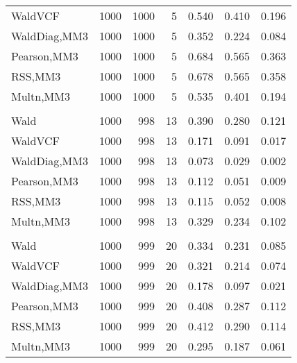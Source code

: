 \documentclass[
]{article}
\begin{document}
\begin{table}[H]
{\begin{tabular}[t]{lrrrrrr}
\hspace{1em}WaldVCF & 1000 & 1000 & 5 & 0.540 & 0.410 & 0.196\\
\hspace{1em}WaldDiag,MM3 & 1000 & 1000 & 5 & 0.352 & 0.224 & 0.084\\
\hspace{1em}Pearson,MM3 & 1000 & 1000 & 5 & 0.684 & 0.565 & 0.363\\
\hspace{1em}RSS,MM3 & 1000 & 1000 & 5 & 0.678 & 0.565 & 0.358\\
\hspace{1em}Multn,MM3 & 1000 & 1000 & 5 & 0.535 & 0.401 & 0.194\\
\addlinespace[0.3em]
\multicolumn{7}{l}{\textbf{2F 10V}}\\
\hspace{1em}Wald & 1000 & 998 & 13 & 0.390 & 0.280 & 0.121\\
\hspace{1em}WaldVCF & 1000 & 998 & 13 & 0.171 & 0.091 & 0.017\\
\hspace{1em}WaldDiag,MM3 & 1000 & 998 & 13 & 0.073 & 0.029 & 0.002\\
\hspace{1em}Pearson,MM3 & 1000 & 998 & 13 & 0.112 & 0.051 & 0.009\\
\hspace{1em}RSS,MM3 & 1000 & 998 & 13 & 0.115 & 0.052 & 0.008\\
\hspace{1em}Multn,MM3 & 1000 & 998 & 13 & 0.329 & 0.234 & 0.102\\
\addlinespace[0.3em]
\multicolumn{7}{l}{\textbf{3F 15V}}\\
\hspace{1em}Wald & 1000 & 999 & 20 & 0.334 & 0.231 & 0.085\\
\hspace{1em}WaldVCF & 1000 & 999 & 20 & 0.321 & 0.214 & 0.074\\
\hspace{1em}WaldDiag,MM3 & 1000 & 999 & 20 & 0.178 & 0.097 & 0.021\\
\hspace{1em}Pearson,MM3 & 1000 & 999 & 20 & 0.408 & 0.287 & 0.112\\
\hspace{1em}RSS,MM3 & 1000 & 999 & 20 & 0.412 & 0.290 & 0.114\\
\hspace{1em}Multn,MM3 & 1000 & 999 & 20 & 0.295 & 0.187 & 0.061\\
\bottomrule
\end{tabular}}
\endgroup{}
\end{table}
\end{document}
